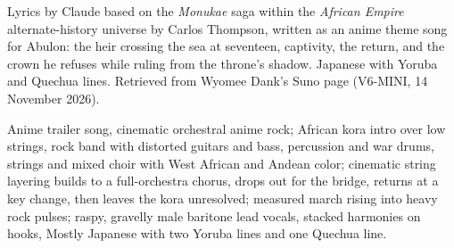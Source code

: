 
\begin{notes}
Lyrics by Claude based on the \emph{Monukae} saga within the \emph{African Empire} alternate-history universe by Carlos Thompson, written as an anime theme song for Abulon: the heir crossing the sea at seventeen, captivity, the return, and the crown he refuses while ruling from the throne's shadow. Japanese with Yoruba and Quechua lines. Retrieved from Wyomee Dank's Suno page (V6-MINI, 14 November 2026).
\end{notes}
\begin{style}
Anime trailer song, cinematic orchestral anime rock; African kora intro over low strings, rock band with distorted guitars and bass, percussion and war drums, strings and mixed choir with West African and Andean color; cinematic string layering builds to a full-orchestra chorus, drops out for the bridge, returns at a key change, then leaves the kora unresolved; measured march rising into heavy rock pulses; raspy, gravelly male baritone lead vocals, stacked harmonies on hooks, Mostly Japanese with two Yoruba lines and one Quechua line.
\end{style}
